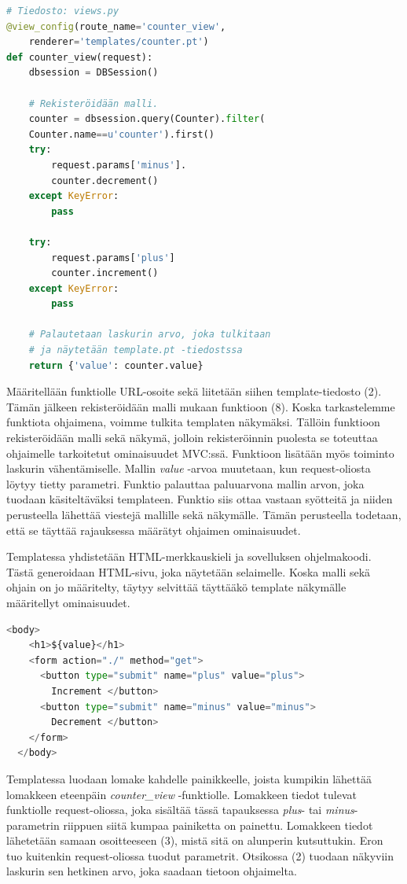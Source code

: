 \documentclass[utf8]{gradu3}
\begin{document}
\begin{lstlisting}[language=Python]
# Tiedosto: views.py
@view_config(route_name='counter_view',
	renderer='templates/counter.pt')
def counter_view(request):
    dbsession = DBSession()

    # Rekisteröidään malli.
    counter = dbsession.query(Counter).filter(
	Counter.name==u'counter').first()
    try:
        request.params['minus'].
        counter.decrement()
    except KeyError:
        pass

    try:
        request.params['plus']
        counter.increment()
    except KeyError:
        pass

    # Palautetaan laskurin arvo, joka tulkitaan
    # ja näytetään template.pt -tiedostssa
    return {'value': counter.value}
\end{lstlisting}
Määritellään funktiolle URL-osoite sekä liitetään siihen template-tiedosto (2). Tämän jälkeen rekisteröidään malli mukaan funktioon (8). Koska tarkastelemme funktiota ohjaimena, voimme tulkita templaten näkymäksi. Tällöin funktioon rekisteröidään malli sekä näkymä, jolloin rekisteröinnin puolesta se toteuttaa ohjaimelle tarkoitetut ominaisuudet MVC:ssä. Funktioon lisätään myös toiminto laskurin vähentämiselle. Mallin \emph{value} -arvoa muutetaan, kun request-oliosta löytyy tietty parametri. Funktio palauttaa paluuarvona mallin arvon, joka tuodaan käsiteltäväksi templateen. Funktio siis ottaa vastaan syötteitä ja niiden perusteella lähettää viestejä
mallille sekä näkymälle. Tämän perusteella todetaan, että se täyttää rajauksessa määrätyt ohjaimen ominaisuudet. 

Templatessa yhdistetään HTML-merkkauskieli ja sovelluksen ohjelmakoodi. Tästä generoidaan HTML-sivu, joka näytetään selaimelle. Koska malli sekä ohjain on jo määritelty, täytyy selvittää täyttääkö template näkymälle määritellyt ominaisuudet.
\begin{lstlisting}[language=Python]
  <body>
    <h1>${value}</h1>
    <form action="./" method="get">
      <button type="submit" name="plus" value="plus">
		Increment </button>
      <button type="submit" name="minus" value="minus"> 
		Decrement </button>
    </form>
  </body>
\end{lstlisting}
Templatessa luodaan lomake kahdelle painikkeelle, joista kumpikin lähettää lomakkeen eteenpäin \emph{counter\_view} -funktiolle. Lomakkeen tiedot tulevat funktiolle request-oliossa, joka sisältää tässä tapauksessa \emph{plus}- tai \emph{minus}-parametrin riippuen siitä kumpaa painiketta on painettu. Lomakkeen tiedot lähetetään samaan osoitteeseen (3), mistä sitä on alunperin kutsuttukin. Eron tuo kuitenkin request-oliossa tuodut parametrit.  Otsikossa (2) tuodaan näkyviin laskurin sen hetkinen arvo, joka saadaan tietoon ohjaimelta.
\end{document}
